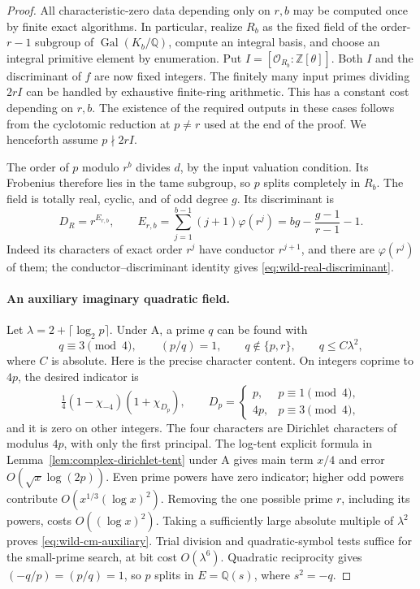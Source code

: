 \documentclass[11pt]{article}
\theoremstyle{definition}
\theoremstyle{remark}
\begin{document}
\begin{proof}
All characteristic-zero data depending only on \(r,b\) may be
computed once by finite exact algorithms. In particular, realize
\(R_b\) as the fixed field of the order-\(r-1\) subgroup of
\(\operatorname{Gal}(K_b/\mathbb Q)\), compute an integral basis,
and choose an integral primitive element by enumeration.
Put \(I=[\mathcal O_{R_b}:\mathbb Z[\theta]]\).
Both \(I\) and the discriminant of \(f\) are now fixed integers.
The finitely many input primes dividing \(2rI\) can be handled
by exhaustive finite-ring arithmetic. This has a constant cost
depending on \(r,b\). The existence of the required outputs in
these cases follows from the cyclotomic reduction at \(p\ne r\)
used at the end of the proof. We henceforth assume \(p\nmid2rI\).

The order of \(p\) modulo \(r^b\) divides \(d\), by the input
valuation condition. Its Frobenius therefore lies in the tame
subgroup, so \(p\) splits completely in \(R_b\). The field is
totally real, cyclic, and of odd degree \(g\). Its discriminant
is
\begin{equation}
 D_R=r^{E_{r,b}},\qquad
 E_{r,b}=\sum_{j=1}^{b-1}(j+1)\varphi(r^j)
        =bg-\frac{g-1}{r-1}-1.
 \label{eq:wild-real-discriminant}
\end{equation}
Indeed its characters of exact order \(r^j\) have conductor
\(r^{j+1}\), and there are \(\varphi(r^j)\) of them; the
conductor--discriminant identity gives \eqref{eq:wild-real-discriminant}.

\paragraph{An auxiliary imaginary quadratic field.}
Let \(\lambda=2+\lceil\log_2p\rceil\).
Under \(\mathrm A\), a prime \(q\) can be found with
\begin{equation}
 q\equiv3\pmod4,\qquad (p/q)=1,\qquad
 q\notin\{p,r\},\qquad q\leq C\lambda^2,
 \label{eq:wild-cm-auxiliary}
\end{equation}
where \(C\) is absolute. Here is the precise character content.
On integers coprime to \(4p\), the desired indicator is
\[
 \tfrac14(1-\chi_{-4})(1+\chi_{D_p}),\qquad
 D_p=\begin{cases}p,&p\equiv1\pmod4,\\4p,&p\equiv3\pmod4,
 \end{cases}
\]
and it is zero on other integers. The four characters are
Dirichlet characters of modulus \(4p\), with only the first
principal. The log-tent explicit formula in
Lemma~\ref{lem:complex-dirichlet-tent} under \(\mathrm A\)
gives main term \(x/4\) and error
\(O(\sqrt x\log(2p))\). Even prime powers have zero indicator;
higher odd powers contribute
\(O(x^{1/3}(\log x)^2)\). Removing the one possible prime
\(r\), including its powers, costs \(O((\log x)^2)\).
Taking a sufficiently large absolute multiple of \(\lambda^2\)
proves \eqref{eq:wild-cm-auxiliary}. Trial division and quadratic-symbol tests suffice
for the small-prime search, at bit cost \(O(\lambda^6)\).
Quadratic reciprocity gives
\(({-q}/p)=(p/q)=1\), so \(p\) splits in
\(E=\mathbb Q(s)\), where \(s^2=-q\).


\end{proof}
\end{document}
